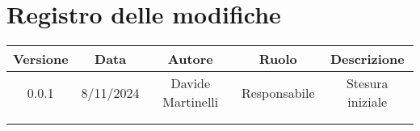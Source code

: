 
\section*{Registro delle modifiche}
\begin{table}[H]
    \begin{tabular}{|c|c|c|c|c|}
        \hline
         \textbf{Versione} &  \textbf{Data} &  \textbf{Autore} &  \textbf{Ruolo} & \textbf{Descrizione} \\
          \hline
          0.0.1 & 8/11/2024 & Davide Martinelli & Responsabile & Stesura iniziale\\
          \hline
          &  &  &  &  \\
          \hline
          &  &  &  &  \\
          \hline
    \end{tabular}
\end{table}